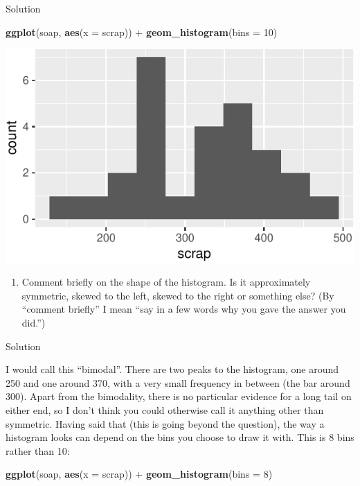 \documentclass[]{tufte-book}
\newenvironment{Shaded}{}{}
\newcommand{\DataTypeTok}[1]{\textcolor[rgb]{0.56,0.13,0.00}{#1}}
\newcommand{\DecValTok}[1]{\textcolor[rgb]{0.25,0.63,0.44}{#1}}
\newcommand{\KeywordTok}[1]{\textcolor[rgb]{0.00,0.44,0.13}{\textbf{#1}}}
\newcommand{\NormalTok}[1]{#1}
\newcommand{\OperatorTok}[1]{\textcolor[rgb]{0.40,0.40,0.40}{#1}}
\newcommand{\StringTok}[1]{\textcolor[rgb]{0.25,0.44,0.63}{#1}}
\providecommand{\tightlist}{%
  \setlength{\itemsep}{0pt}\setlength{\parskip}{0pt}}
\theoremstyle{definition}
\theoremstyle{definition}
\theoremstyle{definition}
\theoremstyle{remark}
\begin{document}
Solution

\begin{Shaded}
\begin{Highlighting}[]
\KeywordTok{ggplot}\NormalTok{(soap, }\KeywordTok{aes}\NormalTok{(}\DataTypeTok{x =}\NormalTok{ scrap)) }\OperatorTok{+}\StringTok{ }\KeywordTok{geom_histogram}\NormalTok{(}\DataTypeTok{bins =} \DecValTok{10}\NormalTok{)}
\end{Highlighting}
\end{Shaded}

\includegraphics{02-reading-in_files/figure-latex/unnamed-chunk-11-1}

\begin{enumerate}
\def\labelenumi{(\alph{enumi})}
\setcounter{enumi}{2}
\tightlist
\item
  Comment briefly on the shape of the histogram. Is it approximately
  symmetric, skewed to the left, skewed to the right or something else?
  (By ``comment briefly'' I mean ``say in a few words why you gave the
  answer you did.'')
\end{enumerate}

Solution

I would call this ``bimodal''. There are two peaks to the histogram, one
around 250 and one around 370, with a very small frequency in between
(the bar around 300). Apart from the bimodality, there is no particular
evidence for a long tail on either end, so I don't think you could
otherwise call it anything other than symmetric. Having said that (this
is going beyond the question), the way a histogram looks can depend on
the bins you choose to draw it with. This is 8 bins rather than 10:

\begin{Shaded}
\begin{Highlighting}[]
\KeywordTok{ggplot}\NormalTok{(soap, }\KeywordTok{aes}\NormalTok{(}\DataTypeTok{x =}\NormalTok{ scrap)) }\OperatorTok{+}\StringTok{ }\KeywordTok{geom_histogram}\NormalTok{(}\DataTypeTok{bins =} \DecValTok{8}\NormalTok{)}
\end{Highlighting}
\end{Shaded}
\end{document}
